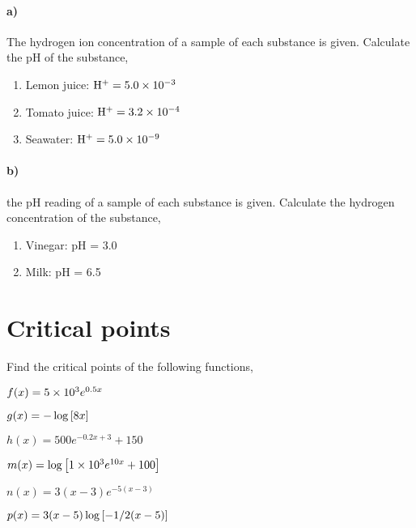 \documentclass[../main.tex]{subfiles}
\begin{document}
\paragraph{a)} The hydrogen ion concentration of a sample of each substance is given.
Calculate the pH of the substance,
\begin{enumerate}
    \item Lemon juice: $\mathrm{H}^+=\num{5.0d-3}$
    \item Tomato juice: $\mathrm{H}^+=\num{3.2d-4}$
    \item Seawater: $\mathrm{H}^+=\num{5.0d-9}$
\end{enumerate}

\paragraph{b)} the pH reading of a sample of each substance is given.
Calculate the hydrogen concentration of the substance,
\begin{enumerate}
    \item Vinegar: pH = \num{3.0}
    \item Milk: pH = \num{6.5}
\end{enumerate}

\section{Critical points}

Find the critical points of the following functions,
\begin{enumerate}
    \begin{minipage}[c]{0.45\textwidth}
        \item $f(x)=\num{5d3}e^{0.5 x}$
        \item $g(x)=-\log\qty[8x]$
        \item $h(x)=500e^{-0.2 x + 3}+150$
    \end{minipage}
    \begin{minipage}[c]{0.45\textwidth}
        \item $m(x)=\log\qty[\num{1d3}e^{10 x}+100]$
        \item $n(x)=3(x-3)e^{-5(x-3)}$
        \item $p(x)=3(x-5)\log\qty[-1/2(x-5)]$
    \end{minipage}
\end{enumerate}
\end{document}
